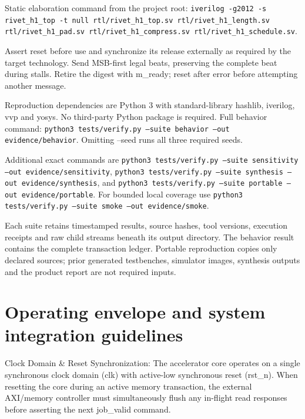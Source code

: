 \documentclass[11pt,a4paper]{article}
\begin{document}
Static elaboration command from the project root: \texttt{iverilog -g2012 -s rivet\_\allowbreak{}h1\_\allowbreak{}top -t null rtl/\allowbreak{}rivet\_\allowbreak{}h1\_\allowbreak{}top.sv rtl/\allowbreak{}rivet\_\allowbreak{}h1\_\allowbreak{}length.sv rtl/\allowbreak{}rivet\_\allowbreak{}h1\_\allowbreak{}pad.sv rtl/\allowbreak{}rivet\_\allowbreak{}h1\_\allowbreak{}compress.sv rtl/\allowbreak{}rivet\_\allowbreak{}h1\_\allowbreak{}schedule.sv}.


Assert reset before use and synchronize its release externally as required by the target technology. Send MSB-first legal beats,\allowbreak{} preserving the complete beat during stalls. Retire the digest with m\_\allowbreak{}ready; reset after error before attempting another message.


Reproduction dependencies are Python 3 with standard-library hashlib,\allowbreak{} iverilog,\allowbreak{} vvp and yosys. No third-party Python package is required. Full behavior command: \texttt{python3 tests/\allowbreak{}verify.py --suite behavior --out evidence/\allowbreak{}behavior}. Omitting --seed runs all three required seeds.


Additional exact commands are \texttt{python3 tests/\allowbreak{}verify.py --suite sensitivity --out evidence/\allowbreak{}sensitivity},\allowbreak{} \texttt{python3 tests/\allowbreak{}verify.py --suite synthesis --out evidence/\allowbreak{}synthesis},\allowbreak{} and \texttt{python3 tests/\allowbreak{}verify.py --suite portable --out evidence/\allowbreak{}portable}. For bounded local coverage use \texttt{python3 tests/\allowbreak{}verify.py --suite smoke --out evidence/\allowbreak{}smoke}.


Each suite retains timestamped results,\allowbreak{} source hashes,\allowbreak{} tool versions,\allowbreak{} execution receipts and raw child streams beneath its output directory. The behavior result contains the complete transaction ledger. Portable reproduction copies only declared sources; prior generated testbenches,\allowbreak{} simulator images,\allowbreak{} synthesis outputs and the product report are not required inputs.


\section{Operating envelope and system integration guidelines}

Clock Domain \& Reset Synchronization: The accelerator core operates on a single synchronous clock domain (\allowbreak{}clk)\allowbreak{} with active-low synchronous reset (\allowbreak{}rst\_\allowbreak{}n)\allowbreak{}. When resetting the core during an active memory transaction,\allowbreak{} the external AXI/\allowbreak{}memory controller must simultaneously flush any in-flight read responses before asserting the next job\_\allowbreak{}valid command.
\end{document}
